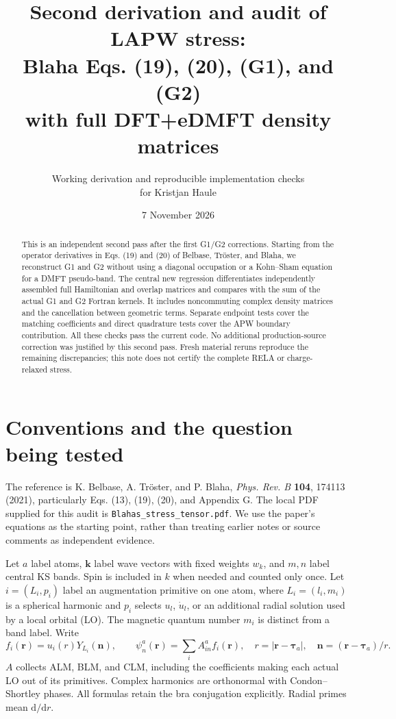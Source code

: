 \documentclass[11pt]{article}
\title{Second derivation and audit of LAPW stress:\\Blaha Eqs. (19), (20), (G1), and (G2)\\with full DFT+eDMFT density matrices}
\author{Working derivation and reproducible implementation checks\\for Kristjan Haule}
\date{7 November 2026}
\newcommand{\dd}{\mathrm d}
\begin{document}
\maketitle
\begin{abstract}
This is an independent second pass after the first G1/G2 corrections. Starting from the operator derivatives in Eqs. (19) and (20) of Belbase, Tr\"oster, and Blaha, we reconstruct G1 and G2 without using a diagonal occupation or a Kohn--Sham equation for a DMFT pseudo-band. The central new regression differentiates independently assembled full Hamiltonian and overlap matrices and compares with the sum of the actual G1 and G2 Fortran kernels. It includes noncommuting complex density matrices and the cancellation between geometric terms. Separate endpoint tests cover the matching coefficients and direct quadrature tests cover the APW boundary contribution. All these checks pass the current code. No additional production-source correction was justified by this second pass. Fresh material reruns reproduce the remaining discrepancies; this note does not certify the complete RELA or charge-relaxed stress.
\end{abstract}
\tableofcontents
\clearpage

\section{Conventions and the question being tested}
The reference is K. Belbase, A. Tr\"oster, and P. Blaha, \emph{Phys. Rev. B} \textbf{104}, 174113 (2021), particularly Eqs. (13), (19), (20), and Appendix G. The local PDF supplied for this audit is \nolinkurl{Blahas_stress_tensor.pdf}. We use the paper's equations as the starting point, rather than treating earlier notes or source comments as independent evidence.

Let $a$ label atoms, $\bm k$ label wave vectors with fixed weights $w_k$, and $m,n$ label central KS bands. Spin is included in $k$ when needed and counted only once. Let $i=(L_i,p_i)$ label an augmentation primitive on one atom, where $L_i=(l_i,m_i)$ is a spherical harmonic and $p_i$ selects $u_l$, $\dot u_l$, or an additional radial solution used by a local orbital (LO). The magnetic quantum number $m_i$ is distinct from a band label. Write
\begin{equation}
 f_i(\bm r)=u_i(r)Y_{L_i}(\bm n),\qquad
 \psi_n^a(\bm r)=\sum_i A^a_{in}f_i(\bm r),\quad
 r=|\bm r-\bm\tau_a|,\quad \bm n=(\bm r-\bm\tau_a)/r .
\end{equation}
$A$ collects ALM, BLM, and CLM, including the coefficients making each actual LO out of its primitives. Complex harmonics are orthonormal with Condon--Shortley phases. All formulas retain the bra conjugation explicitly. Radial primes mean $\dd/\dd r$.
\end{document}
